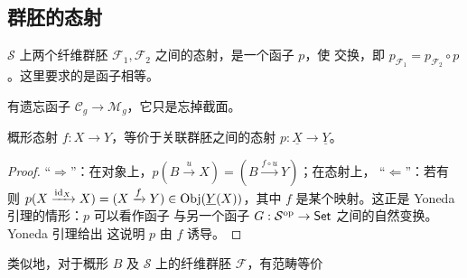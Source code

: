 \subsection{群胚的态射}
\begin{definition}\label{def:2.2}
$\mathcal S$ 上两个纤维群胚 $\mathcal F_1,\mathcal F_2$ 之间的态射，是一个函子 $p$，使
交换，即 $p_{\mathcal F_1}=p_{\mathcal F_2}\circ p$。这里要求的是函子相等。
\end{definition}
\begin{example}\label{ex:2.7}有遗忘函子 $\mathcal C_g\to\mathcal M_g$，它只是忘掉截面。\end{example}
\begin{example}\label{ex:2.8}
概形态射 $f:X\to Y$，等价于关联群胚之间的态射 $p:\underline X\to\underline Y$。
\begin{proof}
“$\Rightarrow$”：在对象上，$p(B\xrightarrow{u}X)=(B\xrightarrow{f\circ u}Y)$；在态射上，
“$\Leftarrow$”：若有
则 $p(X\xrightarrow{\operatorname{id}_X}X)=(X\xrightarrow fY)\in\operatorname{Obj}(\underline Y(X))$，其中 $f$ 是某个映射。这正是 Yoneda 引理的情形：$p$ 可以看作函子
与另一个函子 $G:\mathcal S^{\mathrm{op}}\to\mathsf{Set}$ 之间的自然变换。Yoneda 引理给出
这说明 $p$ 由 $f$ 诱导。
\end{proof}
\end{example}
\begin{example}\label{ex:2.9}
类似地，对于概形 $B$ 及 $\mathcal S$ 上的纤维群胚 $\mathcal F$，有范畴等价
\end{example}

